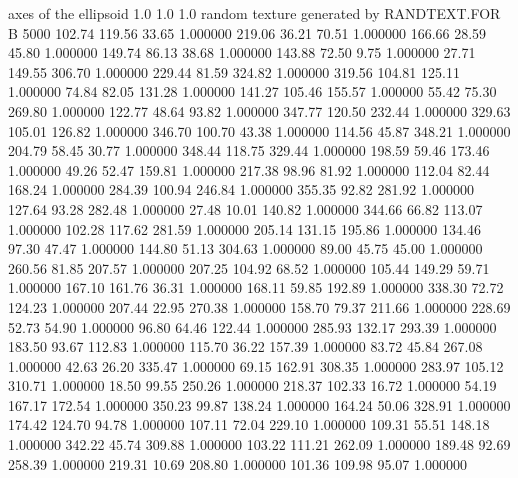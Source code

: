 axes of the ellipsoid
  1.0  1.0  1.0
random texture generated by RANDTEXT.FOR
B 5000
    102.74    119.56     33.65  1.000000
    219.06     36.21     70.51  1.000000
    166.66     28.59     45.80  1.000000
    149.74     86.13     38.68  1.000000
    143.88     72.50      9.75  1.000000
     27.71    149.55    306.70  1.000000
    229.44     81.59    324.82  1.000000
    319.56    104.81    125.11  1.000000
     74.84     82.05    131.28  1.000000
    141.27    105.46    155.57  1.000000
     55.42     75.30    269.80  1.000000
    122.77     48.64     93.82  1.000000
    347.77    120.50    232.44  1.000000
    329.63    105.01    126.82  1.000000
    346.70    100.70     43.38  1.000000
    114.56     45.87    348.21  1.000000
    204.79     58.45     30.77  1.000000
    348.44    118.75    329.44  1.000000
    198.59     59.46    173.46  1.000000
     49.26     52.47    159.81  1.000000
    217.38     98.96     81.92  1.000000
    112.04     82.44    168.24  1.000000
    284.39    100.94    246.84  1.000000
    355.35     92.82    281.92  1.000000
    127.64     93.28    282.48  1.000000
     27.48     10.01    140.82  1.000000
    344.66     66.82    113.07  1.000000
    102.28    117.62    281.59  1.000000
    205.14    131.15    195.86  1.000000
    134.46     97.30     47.47  1.000000
    144.80     51.13    304.63  1.000000
     89.00     45.75     45.00  1.000000
    260.56     81.85    207.57  1.000000
    207.25    104.92     68.52  1.000000
    105.44    149.29     59.71  1.000000
    167.10    161.76     36.31  1.000000
    168.11     59.85    192.89  1.000000
    338.30     72.72    124.23  1.000000
    207.44     22.95    270.38  1.000000
    158.70     79.37    211.66  1.000000
    228.69     52.73     54.90  1.000000
     96.80     64.46    122.44  1.000000
    285.93    132.17    293.39  1.000000
    183.50     93.67    112.83  1.000000
    115.70     36.22    157.39  1.000000
     83.72     45.84    267.08  1.000000
     42.63     26.20    335.47  1.000000
     69.15    162.91    308.35  1.000000
    283.97    105.12    310.71  1.000000
     18.50     99.55    250.26  1.000000
    218.37    102.33     16.72  1.000000
     54.19    167.17    172.54  1.000000
    350.23     99.87    138.24  1.000000
    164.24     50.06    328.91  1.000000
    174.42    124.70     94.78  1.000000
    107.11     72.04    229.10  1.000000
    109.31     55.51    148.18  1.000000
    342.22     45.74    309.88  1.000000
    103.22    111.21    262.09  1.000000
    189.48     92.69    258.39  1.000000
    219.31     10.69    208.80  1.000000
    101.36    109.98     95.07  1.000000
